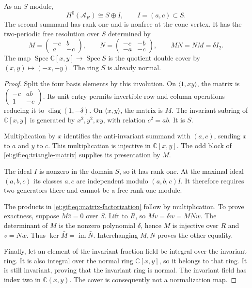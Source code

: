 \begin{theorem}\label{ei:gif:thm:triangle-module}
As an $S$-module,
\begin{equation}\label{ei:gif:eq:nonfree-module}
 H^0(\mathcal A_R)\cong S\oplus I,
 \qquad I=(a,c)\subset S.
\end{equation}
The second summand has rank one and is nonfree at the
cone vertex. It has the two-periodic free resolution
over $S$ determined by
\begin{equation}\label{ei:gif:eq:matrix-factorization}
 M=\begin{pmatrix}-c&b\\a&-c\end{pmatrix},\qquad
 N=\begin{pmatrix}-c&-b\\-a&-c\end{pmatrix},
 \qquad MN=NM=\delta I_2.
\end{equation}
The map $\operatorname{Spec}\mathbb C[x,y]
\to\operatorname{Spec}S$ is the quotient double cover
by $(x,y)\mapsto(-x,-y)$. The ring $S$ is already normal.
\end{theorem}

\begin{proof}
Split the four basis elements by this involution.
On $\langle1,xy\rangle$, the matrix is
$\left(\begin{smallmatrix}-c&ab\\1&-c\end{smallmatrix}\right)$.
Its unit entry permits invertible row and column
operations reducing it to $\operatorname{diag}(1,-\delta)$.
On $\langle x,y\rangle$, the matrix is $M$.
The invariant subring of $\mathbb C[x,y]$ is generated
by $x^2,y^2,xy$, with relation $c^2=ab$. It is $S$.

Multiplication by $x$ identifies the anti-invariant
summand with $(a,c)$, sending $x$ to $a$ and $y$ to $c$.
This multiplication is injective in $\mathbb C[x,y]$.
The odd block of \eqref{ei:gif:eq:triangle-matrix} supplies
its presentation by $M$.

The ideal $I$ is nonzero in the domain $S$, so it has
rank one. At the maximal ideal $(a,b,c)$ its classes
$a,c$ are independent modulo $(a,b,c)I$. It therefore
requires two generators there and cannot be a free
rank-one module.

The products in \eqref{ei:gif:eq:matrix-factorization}
follow by multiplication. To prove exactness, suppose
$M\bar v=0$ over $S$. Lift to $R$, so
$Mv=\delta w=MNw$. The determinant of $M$ is the
nonzero polynomial $\delta$, hence $M$ is injective
over $R$ and $v=Nw$. Thus $\ker\bar M=\operatorname{im}\bar N$.
Interchanging $M,N$ proves the other equality.

Finally, let an element of the invariant fraction field be
integral over the invariant ring. It is also integral over the
normal ring $\mathbb C[x,y]$, so it belongs to that ring.
It is still invariant, proving that the invariant ring is normal. The invariant
field has index two in $\mathbb C(x,y)$.
The cover is consequently not a normalization map.
\end{proof}


